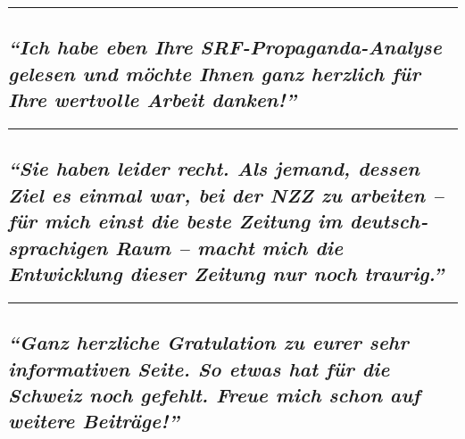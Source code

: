 \begin{center}\rule{0.5\linewidth}{\linethickness}\end{center}

\hypertarget{ich-habe-eben-ihre-srf-propaganda-analyse-gelesen-und-muxf6chte-ihnen-ganz-herzlich-fuxfcr-ihre-wertvolle-arbeit-danken}{%
\subsection{\texorpdfstring{\emph{``Ich habe eben Ihre
SRF-Propaganda-Analyse gelesen und möchte Ihnen ganz herzlich für Ihre
wertvolle Arbeit
danken!''}}{``Ich habe eben Ihre SRF-Propaganda-Analyse gelesen und möchte Ihnen ganz herzlich für Ihre wertvolle Arbeit danken!''}}\label{ich-habe-eben-ihre-srf-propaganda-analyse-gelesen-und-muxf6chte-ihnen-ganz-herzlich-fuxfcr-ihre-wertvolle-arbeit-danken}}

\begin{center}\rule{0.5\linewidth}{\linethickness}\end{center}

\hypertarget{sie-haben-leider-recht-als-jemand-dessen-ziel-es-einmal-war-bei-der-nzz-zu-arbeiten--fuxfcr-mich-einst-die-beste-zeitung-im-deutschsprachigen-raum--macht-mich-die-entwicklung-dieser-zeitung-nur-noch-traurig}{%
\subsection{\texorpdfstring{\emph{``Sie haben leider recht. Als jemand,
dessen Ziel es einmal war, bei der NZZ zu arbeiten -- für mich einst die
beste Zeitung im deutsch­sprachigen Raum -- macht mich die Entwicklung
dieser Zeitung nur noch
traurig.''}}{``Sie haben leider recht. Als jemand, dessen Ziel es einmal war, bei der NZZ zu arbeiten -- für mich einst die beste Zeitung im deutsch­sprachigen Raum -- macht mich die Entwicklung dieser Zeitung nur noch traurig.''}}\label{sie-haben-leider-recht-als-jemand-dessen-ziel-es-einmal-war-bei-der-nzz-zu-arbeiten--fuxfcr-mich-einst-die-beste-zeitung-im-deutschsprachigen-raum--macht-mich-die-entwicklung-dieser-zeitung-nur-noch-traurig}}

\begin{center}\rule{0.5\linewidth}{\linethickness}\end{center}

\hypertarget{ganz-herzliche-gratulation-zu-eurer-sehr-informativen-seite-so-etwas-hat-fuxfcr-die-schweiz-noch-gefehlt-freue-mich-schon-auf-weitere-beitruxe4ge}{%
\subsection{\texorpdfstring{\emph{``Ganz herzliche Gratulation zu eurer
sehr infor­ma­tiven Seite. So etwas hat für die Schweiz noch gefehlt.
Freue mich schon auf weitere
Beiträge!''}}{``Ganz herzliche Gratulation zu eurer sehr infor­ma­tiven Seite. So etwas hat für die Schweiz noch gefehlt. Freue mich schon auf weitere Beiträge!''}}\label{ganz-herzliche-gratulation-zu-eurer-sehr-informativen-seite-so-etwas-hat-fuxfcr-die-schweiz-noch-gefehlt-freue-mich-schon-auf-weitere-beitruxe4ge}}

